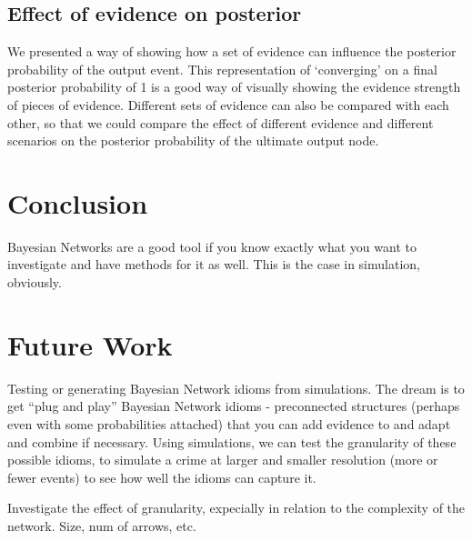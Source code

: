 \subsection{Effect of evidence on posterior}

We presented a way of showing how a set of evidence can influence the posterior probability of the output event. This representation of `converging' on a final posterior probability of 1 is a good way of visually showing the evidence strength of pieces of evidence. Different sets of evidence can also be compared with each other, so that we could compare the effect of different evidence and different scenarios on the posterior probability of the ultimate output node.


\section{Conclusion}
Bayesian Networks are a good tool if you know exactly what you want to investigate and have methods for it as well. This is the case in simulation, obviously.


\section{Future Work}
Testing or generating Bayesian Network idioms from simulations. The dream is to get ``plug and play'' Bayesian Network idioms - preconnected structures (perhaps even with some probabilities attached) that you can add evidence to and adapt and combine if necessary. Using simulations, we can test the granularity of these possible idioms, to simulate a crime at larger and smaller resolution (more or fewer events) to see how well the idioms can capture it.

Investigate the effect of granularity, expecially in relation to the complexity of the network. Size, num of arrows, etc. 